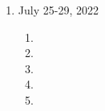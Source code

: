 \begin{enumerate}[label=Week \arabic*]
\begin{enumerate}[label=Day \arabic*]
	\end{enumerate}
	\item July 25-29, 2022 
	\begin{enumerate}[label=Day \arabic*]
		\item 

		\item 

		\item 

		\item 

		\item 

	\end{enumerate}
\end{enumerate}
